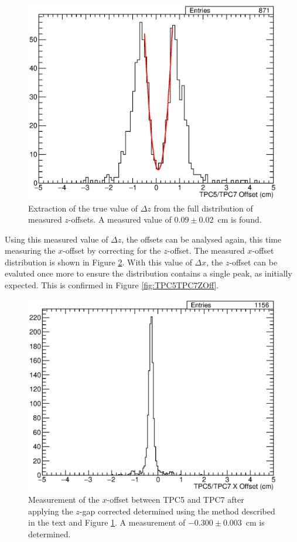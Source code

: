 \begin{figure}
  \centering
  \includegraphics[width=12cm]{TPC5TPC7GapFit.eps}
  \caption{Extraction of the true value of $\Delta z$ from the full distribution of measured $z$-offsets.  A measured value of $0.09\pm0.02$~cm is found.}
  \label{fig:TPC5TPC7GapFit}
\end{figure}

Using this measured value of $\Delta z$, the offsets can be analysed again, this time measuring the $x$-offset by correcting for the $z$-offset.  The measured $x$-offset distribution is shown in Figure \ref{fig:TPC5TPC7XOff}.  With this value of $\Delta x$, the $z$-offset can be evaluted once more to ensure the distribution contains a single peak, as initially expected.  This is confirmed in Figure \ref{fig:TPC5TPC7ZOff}.

\begin{figure}
  \centering
  \includegraphics[width=12cm]{TPC5TPC7XOff.eps}
  \caption{Measurement of the $x$-offset between TPC5 and TPC7 after applying the $z$-gap corrected determined using the method described in the text and Figure \ref{fig:TPC5TPC7GapFit}.  A measurement of $-0.300\pm0.003$~cm is determined.}
  \label{fig:TPC5TPC7XOff}
\end{figure}

